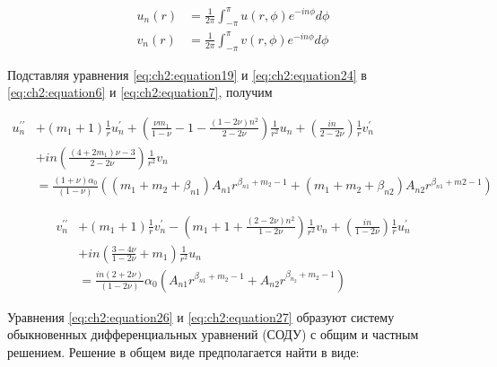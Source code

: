 \begin{equation}
\label{eq:ch2:equation25}
\begin{split}
	u_n(r) &= \frac{1}{2\pi} \int_{-\pi}^{\pi} u(r, \phi) e^{-in\phi} d\phi\\
	v_n(r) &= \frac{1}{2\pi} \int_{-\pi}^{\pi} v(r, \phi) e^{-in\phi} d\phi
\end{split}
\end{equation}

Подставляя уравнения \cref{eq:ch2:equation19} и \cref{eq:ch2:equation24} в \cref{eq:ch2:equation6} и \cref{eq:ch2:equation7}, получим

\begin{equation}
	\label{eq:ch2:equation26}
	\begin{split}
		u_n^{\prime\prime} & + \left ( m_1 + 1 \right ) \frac{1}{r} u_n^{\prime} + \left ( \frac{\nu m_1}{1-\nu} -1 - \frac{\left ( 1 - 2\nu \right ) n^2} {2-2\nu} \right ) \frac{1}{r^2} u_n + \left ( \frac{in}{2-2\nu} \right ) \frac{1}{r}v_n^{\prime} 
		\\
		& +in \left ( \frac{ \left (4+2 m_1 \right ) \nu -3}{2-2\nu}\right ) \frac{1}{r^2}v_n 
		\\
		&= \frac{\left (1+\nu \right ) \alpha_0 }{\left (1-\nu \right ) } \left ( \left ( m_1 + m_2 +\beta_{n1} \right ) A_{n1} r^{\beta_{n1}+m_2-1} + \left ( m_1 +m_2 + \beta_{n2} \right ) A_{n2} r^{\beta_{n1}+m2-1} \right )
	\end{split}
\end{equation}

\begin{equation}
	\label{eq:ch2:equation27}
	\begin{split}
		v_n^{\prime\prime} &+ \left ( m_1 + 1 \right ) \frac{1}{r} v_n^{\prime} - \left  ( m_1 + 1 + \frac{\left  ( 2-2\nu \right  ) n^2}{1-2\nu} \right  ) \frac{1}{r^2}v_n + \left ( \frac{in}{1-2\nu} \right )\frac{1}{r}u_n^{\prime} 
		\\
		 &+ in \left  (\frac{3-4\nu}{1-2\nu} + m_1 \right  ) \frac{1}{r^2} u_n 
		\\
		& = \frac{in \left  (2+2\nu \right ) }{\left  ( 1-2\nu \right ) } \alpha_0 \left  ( A_{n1} r^{\beta_{n1}+m_2-1} + A_{n2} r^{\beta_{n_2}+m_2 -1} \right )
	\end{split}
\end{equation}

Уравнения \cref{eq:ch2:equation26} и \cref{eq:ch2:equation27} образуют систему обыкновенных дифференциальных уравнений (СОДУ) с общим и частным решением. Решение в общем виде предполагается найти в виде:

